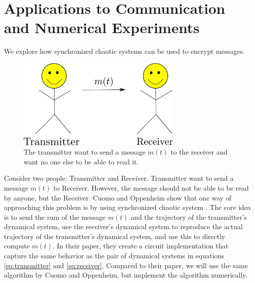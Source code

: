 \documentclass[12pt]{article}
\begin{document}
    \section{Applications to Communication and Numerical Experiments}
    We explore how synchronized chaotic systems can be used to encrypt messages. 
    \begin{figure}[H]
        \includegraphics[width=8cm]{drawing.png}
        \centering
        \caption{The transmitter want to send a message $m(t)$ to the receiver and want no one else to be able to read it.}
    \end{figure}
    Consider two people: Transmitter and Receiver. Transmitter want to send a message $m(t)$ to Receiver. However, the message should not be able to be read by anyone, but the Receiver. Cuomo and Oppenheim show that one way of approaching this problem is by using synchronized chaotic system \cite{cuomo1993}. The core idea is to send the sum of the message $m(t)$ and the trajectory of the transmitter's dynamical system, use the receiver's dynamical system to reproduce the actual trajectory of the transmitter's dynamical system, and use this to directly compute $m(t)$. In their paper, they create a circuit implementation that capture the same behavior as the pair of dynamical systems in equations \ref{eq:transmitter} and \ref{eq:receiver}. Compared to their paper, we will use the same algorithm by Cuomo and Oppenheim, but implement the algorithm numerically. 
\end{document}
